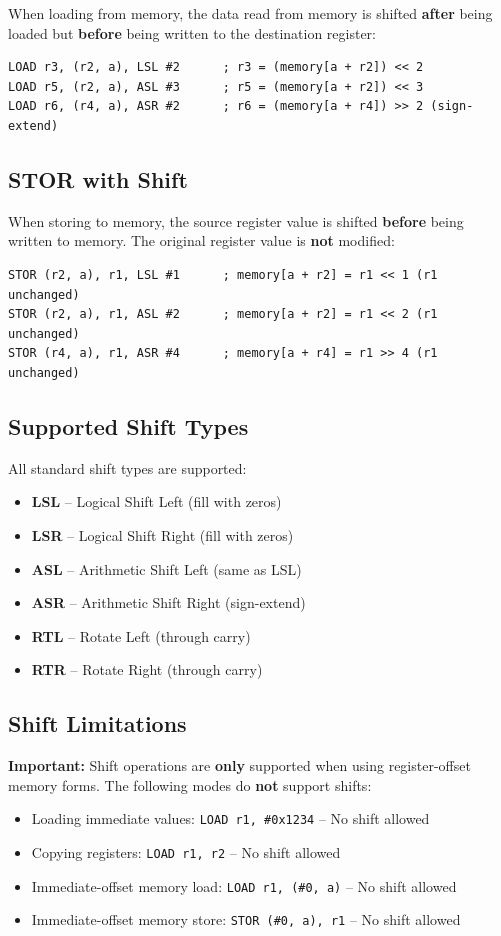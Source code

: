When loading from memory, the data read from memory is shifted \textbf{after} being loaded but \textbf{before} being
written to the destination register:

\begin{lstlisting}
LOAD r3, (r2, a), LSL #2      ; r3 = (memory[a + r2]) << 2
LOAD r5, (r2, a), ASL #3      ; r5 = (memory[a + r2]) << 3
LOAD r6, (r4, a), ASR #2      ; r6 = (memory[a + r4]) >> 2 (sign-extend)
\end{lstlisting}

\subsection{STOR with Shift}

When storing to memory, the source register value is shifted \textbf{before} being written to memory. The original
register value is \textbf{not} modified:

\begin{lstlisting}
STOR (r2, a), r1, LSL #1      ; memory[a + r2] = r1 << 1 (r1 unchanged)
STOR (r2, a), r1, ASL #2      ; memory[a + r2] = r1 << 2 (r1 unchanged)
STOR (r4, a), r1, ASR #4      ; memory[a + r4] = r1 >> 4 (r1 unchanged)
\end{lstlisting}

\subsection{Supported Shift Types}

All standard shift types are supported:
\begin{itemize}
	\item \textbf{LSL} -- Logical Shift Left (fill with zeros)
	\item \textbf{LSR} -- Logical Shift Right (fill with zeros)
	\item \textbf{ASL} -- Arithmetic Shift Left (same as LSL)
	\item \textbf{ASR} -- Arithmetic Shift Right (sign-extend)
	\item \textbf{RTL} -- Rotate Left (through carry)
	\item \textbf{RTR} -- Rotate Right (through carry)
\end{itemize}

\subsection{Shift Limitations}

\textbf{Important:} Shift operations are \textbf{only} supported when using register-offset memory forms. The following modes do \textbf{not} support shifts:
\begin{itemize}
	\item Loading immediate values: \texttt{LOAD r1, \#0x1234} -- No shift allowed
	\item Copying registers: \texttt{LOAD r1, r2} -- No shift allowed
	\item Immediate-offset memory load: \texttt{LOAD r1, (\#0, a)} -- No shift allowed
	\item Immediate-offset memory store: \texttt{STOR (\#0, a), r1} -- No shift allowed
\end{itemize}

